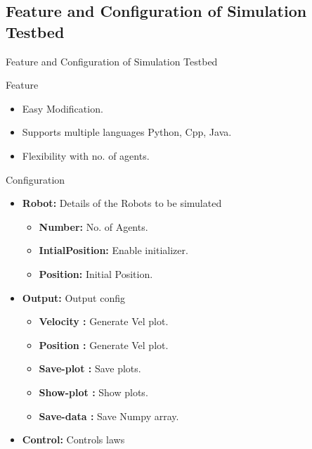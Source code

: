 \documentclass[10pt]{beamer}
\begin{document}
\subsection*{Feature and Configuration of Simulation Testbed}
\begin{frame}{Feature and Configuration of Simulation Testbed}
	\vspace*{-0.2 cm}
	\begin{block}{Feature}
		\begin{itemize}
			\item Easy Modification.
			\item Supports multiple languages Python, Cpp, Java.
			\item Flexibility with no. of agents.
		\end{itemize}
	\end{block}
	\pause
	\vspace*{-0.2 cm}
	\begin{block}{Configuration}
	\begin{minipage}{0.47\textwidth}
		\begin{itemize}
			\item \textbf{Robot:} Details of the Robots to be simulated
			      \begin{itemize}
				      \item \textbf{Number:} No. of Agents.
				      \item \textbf{IntialPosition:} Enable initializer.
				      \item \textbf{Position:} Initial Position.
			      \end{itemize}
			\item \textbf{Output:} Output config
			      \begin{itemize}
				      \item \textbf{Velocity : }Generate Vel plot.
				      \item \textbf{Position : }Generate Vel plot.
				      \item \textbf{Save-plot : }Save plots.
				      \item \textbf{Show-plot : }Show plots.
				      \item \textbf{Save-data : }Save Numpy array.
			      \end{itemize}
		\end{itemize}
	\end{minipage}
	\begin{minipage}{0.47\textwidth}
		\begin{itemize}
			\item \textbf{Control: }Controls laws

\end{itemize}
\end{minipage}
\end{block}
\end{frame}
\end{document}
